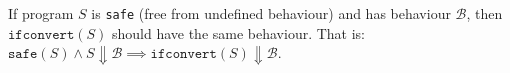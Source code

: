 \begin{theorem}\label{def:forwardsim}
  If program $S$ is \texttt{safe} (free from undefined behaviour) and has
  behaviour $\mathcal{B}$, then $\mathtt{ifconvert}(S)$ should have the same
  behaviour. That is:
  $\mathtt{safe}(S) \land S \Downarrow \mathcal{B} \implies
  \mathtt{ifconvert}(S) \Downarrow \mathcal{B}$.



\end{theorem}

